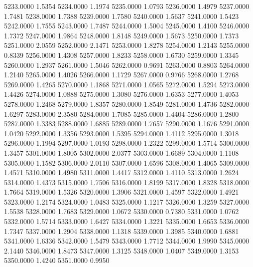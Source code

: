 5233.0000      1.5354
5234.0000      1.1974
5235.0000      1.0793
5236.0000      1.4979
5237.0000      1.7481
5238.0000      1.7388
5239.0000      1.7580
5240.0000      1.5637
5241.0000      1.5423
5242.0000      1.7555
5243.0000      1.7487
5244.0000      1.5004
5245.0000      1.4100
5246.0000      1.7372
5247.0000      1.9864
5248.0000      1.8148
5249.0000      1.5673
5250.0000      1.7373
5251.0000      2.0559
5252.0000      2.1471
5253.0000      1.8278
5254.0000      1.2143
5255.0000      0.8339
5256.0000      1.4308
5257.0000      1.8233
5258.0000      1.6730
5259.0000      1.3345
5260.0000      1.2937
5261.0000      1.5046
5262.0000      0.9691
5263.0000      0.8803
5264.0000      1.2140
5265.0000      1.4026
5266.0000      1.1729
5267.0000      0.9766
5268.0000      1.2768
5269.0000      1.4265
5270.0000      1.1868
5271.0000      1.0565
5272.0000      1.5294
5273.0000      1.4426
5274.0000      1.0888
5275.0000      1.3080
5276.0000      1.6353
5277.0000      1.4053
5278.0000      1.2468
5279.0000      1.8357
5280.0000      1.8549
5281.0000      1.4736
5282.0000      1.6297
5283.0000      2.3580
5284.0000      1.7085
5285.0000      1.4404
5286.0000      1.2800
5287.0000      1.3383
5288.0000      1.6885
5289.0000      1.7657
5290.0000      1.1676
5291.0000      1.0420
5292.0000      1.3356
5293.0000      1.5395
5294.0000      1.4112
5295.0000      1.3018
5296.0000      1.1994
5297.0000      1.0193
5298.0000      1.2322
5299.0000      1.5714
5300.0000      1.3457
5301.0000      1.8005
5302.0000      2.0377
5303.0000      1.6689
5304.0000      1.1108
5305.0000      1.1582
5306.0000      2.0110
5307.0000      1.6596
5308.0000      1.4065
5309.0000      1.4571
5310.0000      1.4980
5311.0000      1.4417
5312.0000      1.4110
5313.0000      1.2624
5314.0000      1.4373
5315.0000      1.7506
5316.0000      1.8199
5317.0000      1.8328
5318.0000      1.7664
5319.0000      1.5326
5320.0000      1.3906
5321.0000      1.4597
5322.0000      1.4921
5323.0000      1.2174
5324.0000      1.0483
5325.0000      1.1217
5326.0000      1.3259
5327.0000      1.5538
5328.0000      1.7683
5329.0000      1.0672
5330.0000      0.7380
5331.0000      1.0762
5332.0000      1.5714
5333.0000      1.6427
5334.0000      1.3221
5335.0000      1.6653
5336.0000      1.7347
5337.0000      1.2904
5338.0000      1.1318
5339.0000      1.3985
5340.0000      1.6881
5341.0000      1.6336
5342.0000      1.5479
5343.0000      1.7712
5344.0000      1.9990
5345.0000      2.1440
5346.0000      1.8473
5347.0000      1.3125
5348.0000      1.0407
5349.0000      1.3153
5350.0000      1.4240
5351.0000      0.9950
